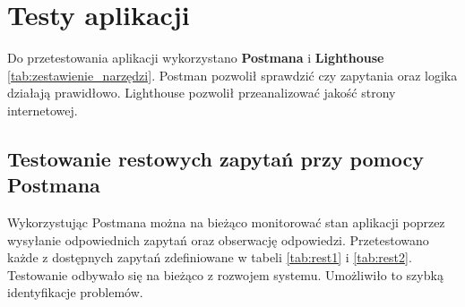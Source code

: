 \chapter{Testy aplikacji}
Do przetestowania aplikacji wykorzystano \textbf{Postmana} i \textbf{Lighthouse} \ref{tab:zestawienie_narzędzi}. Postman pozwolił sprawdzić czy zapytania oraz logika działają prawidłowo. Lighthouse pozwolił przeanalizować jakość strony internetowej.

\section{Testowanie restowych zapytań przy pomocy Postmana}
Wykorzystując Postmana można na bieżąco monitorować stan aplikacji poprzez wysyłanie odpowiednich zapytań oraz obserwację odpowiedzi. Przetestowano każde z dostępnych zapytań zdefiniowane w tabeli \ref{tab:rest1} i \ref{tab:rest2}. Testowanie odbywało się na bieżąco z rozwojem systemu. Umożliwiło to szybką identyfikacje problemów.

